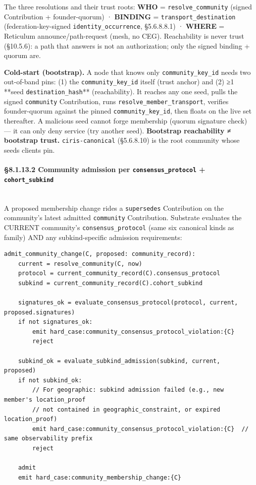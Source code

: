 \documentclass[11pt]{article}
\begin{document}
The three resolutions and their trust roots: \textbf{WHO} = \texttt{resolve\_community} (signed Contribution + founder-quorum) · \textbf{BINDING} = \texttt{transport\_destination} (federation-key-signed \texttt{identity\_occurrence}, §5.6.8.8.1) · \textbf{WHERE} = Reticulum announce/path-request (mesh, no CEG). Reachability is never trust (§10.5.6): a path that answers is not an authorization; only the signed binding + quorum are.


\textbf{Cold-start (bootstrap).} A node that knows only \texttt{community\_key\_id} needs two out-of-band pins: (1) the \texttt{community\_key\_id} itself (trust anchor) and (2) ≥1 **seed \texttt{destination\_hash}** (reachability). It reaches any one seed, pulls the signed \texttt{community} Contribution, runs \texttt{resolve\_member\_transport}, verifies founder-quorum against the pinned \texttt{community\_key\_id}, then floats on the live set thereafter. A malicious seed cannot forge membership (quorum signature check) — it can only deny service (try another seed). \textbf{Bootstrap reachability ≠ bootstrap trust.} \texttt{ciris-canonical} (§5.6.8.10) is the root community whose seeds clients pin.


\paragraph{§8.1.13.2 Community admission per \texttt{consensus\_protocol} + \texttt{cohort\_subkind}}\mbox{}\\


A proposed membership change rides a \texttt{supersedes} Contribution on the community's latest admitted \texttt{community} Contribution. Substrate evaluates the CURRENT community's \texttt{consensus\_protocol} (same six canonical kinds as family) AND any subkind-specific admission requirements:


\begin{lstlisting}
admit_community_change(C, proposed: community_record):
    current = resolve_community(C, now)
    protocol = current_community_record(C).consensus_protocol
    subkind = current_community_record(C).cohort_subkind

    signatures_ok = evaluate_consensus_protocol(protocol, current, proposed.signatures)
    if not signatures_ok:
        emit hard_case:community_consensus_protocol_violation:{C}
        reject

    subkind_ok = evaluate_subkind_admission(subkind, current, proposed)
    if not subkind_ok:
        // For geographic: subkind admission failed (e.g., new member's location_proof
        // not contained in geographic_constraint, or expired location_proof)
        emit hard_case:community_consensus_protocol_violation:{C}  // same observability prefix
        reject

    admit
    emit hard_case:community_membership_change:{C}
\end{lstlisting}
\end{document}
